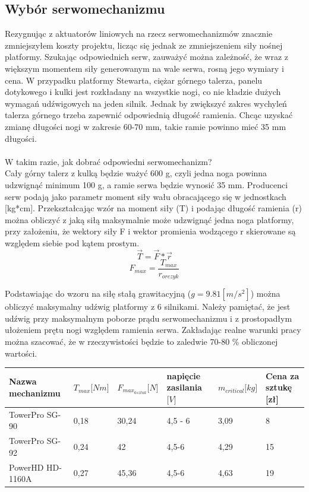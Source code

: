 \subsection{Wybór serwomechanizmu}
Rezygnując z aktuatorów liniowych na rzecz serwomechanizmów znacznie zmniejszyłem koszty projektu, licząc się jednak ze zmniejszeniem siły nośnej platformy.
Szukając odpowiednich serw, zauważyć można zależność, że wraz z większym momentem siły generowanym na wale serwa, rosną jego wymiary i cena.
W przypadku platformy Stewarta, ciężar górnego talerza, panelu dotykowego i kulki jest rozkładany na wszystkie nogi, co nie kładzie dużych wymagań udźwigowych na jeden silnik.
Jednak by zwiększyć zakres wychyleń talerza górnego trzeba zapewnić odpowiednią długość ramienia.
Chcąc uzyskać zmianę długości nogi w zakresie 60-70 mm, takie ramie powinno mieć 35 mm długości. 
\\ \\
W takim razie, jak dobrać odpowiedni serwomechanizm? \\
Cały górny talerz z kulką będzie ważyć 600 g, czyli jedna noga powinna udzwignąć minimum 100 g, a ramie serwa będzie wynosić 35 mm.
Producenci serw podają jako parametr moment siły wału obracającego się w jednostkach [kg*cm].
Przekształcając wzór na moment siły (T) i podając długość ramienia (r) można obliczyć z jaką siłą maksymalnie może udzwignąć jedna noga platformy, przy założeniu, że wektory siły F i wektor promienia wodzącego r skierowane są względem siebie pod kątem prostym.
\begin{equation}
    \vec{T} = \vec{F} * \vec{r}
\end{equation}{}
\begin{equation}
    F_{max} = \frac{T_{max}}{r_{orczyk}}
\end{equation}{}

Podstawiając do wzoru na siłę stałą grawitacyjną ($g=9.81 [m/s^2]$) można obliczyć maksymalny udźwig platformy z 6 silnikami.
Należy pamiętać, że jest udźwig przy maksymalnym poborze prądu serwomechanizmu i z prostopadłym ułożeniem prętu nogi względem ramienia serwa. 
Zakładając realne warunki pracy można szacować, że w rzeczywistości będzie to zaledwie 70-80 \% obliczonej wartości.

\begin{table}[!h]
\begin{tabular}{|l|l|l|l|l|l|}
\hline
Nazwa mechanizmu & $T_{max} {[}Nm{]}$ & $F_{max_{6 sztuk}} {[}N{]}$ & napięcie zasilania ${[}V{]}$ & $m_{critical} {[}kg{]}$ & Cena za sztukę {[}zł{]} \\ \hline
TowerPro SG-90 & 0,18 & 30,24 & 4,5 - 6 & 3,09 & 8 \\ \hline
TowerPro SG-92 & 0,24 & 42 & 4,5-6 & 4,29 & 15 \\ \hline
PowerHD HD-1160A & 0,27 & 45,36 & 4,5-6 & 4,63 & 19 \\ \hline
\end{tabular}
\end{table}

